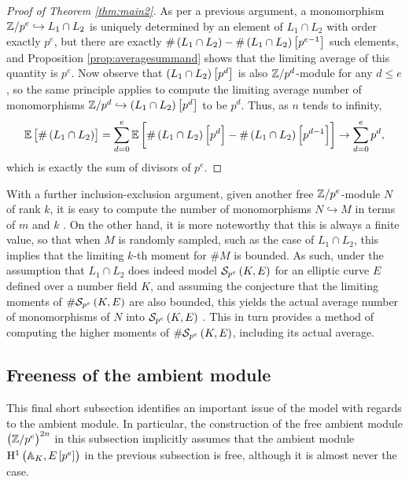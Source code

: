 \begin{proof}[Proof of Theorem \ref{thm:main2}]
As per a previous argument, a monomorphism $ \mathbb{Z} / p^e \hookrightarrow L_1 \cap L_2 $ is uniquely determined by an element of $ L_1 \cap L_2 $ with order exactly $ p^e $, but there are exactly $ \#\br{L_1 \cap L_2} - \#\br{L_1 \cap L_2}\sbr{p^{e - 1}} $ such elements, and Proposition \ref{prop:averagesummand} shows that the limiting average of this quantity is $ p^e $. Now observe that $ \br{L_1 \cap L_2}\sbr{p^d} $ is also $ \mathbb{Z} / p^d $-module for any $ d \le e $, so the same principle applies to compute the limiting average number of monomorphisms $ \ZZ / p^d \hookrightarrow \br{L_1 \cap L_2}\sbr{p^d} $ to be $ p^d $. Thus, as $ n $ tends to infinity,
$$ \EE\sbr{\#\br{L_1 \cap L_2}} = \sum_{d = 0}^e \EE\sbr{\#\br{L_1 \cap L_2}\sbr{p^d} - \#\br{L_1 \cap L_2}\sbr{p^{d - 1}}} \to \sum_{d = 0}^e p^d, $$
which is exactly the sum of divisors of $ p^e $.
\end{proof}

\pagebreak

\begin{remark}
With a further inclusion-exclusion argument, given another free $ \mathbb{Z} / p^e $-module $ N $ of rank $ k $, it is easy to compute the number of monomorphisms $ N \hookrightarrow M $ in terms of $ m $ and $ k $ \cite[Theorem 5.10]{BKLPR15}. On the other hand, it is more noteworthy that this is always a finite value, so that when $ M $ is randomly sampled, such as the case of $ L_1 \cap L_2 $, this implies that the limiting $ k $-th moment for $ \#M $ is bounded. As such, under the assumption that $ L_1 \cap L_2 $ does indeed model $ \Sel[p^e] $ for an elliptic curve $ E $ defined over a number field $ K $, and assuming the conjecture that the limiting moments of $ \#\Sel[p^e] $ are also bounded, this yields the actual average number of monomorphisms of $ N $ into $ \Sel[p^e] $ \cite[Remark 5.13]{BKLPR15}. This in turn provides a method of computing the higher moments of $ \#\Sel[p^e] $, including its actual average.
\end{remark}

\subsection{Freeness of the ambient module}

This final short subsection identifies an important issue of the model with regards to the ambient module. In particular, the construction of the free ambient module $ \br{\ZZ / p^e}^{2n} $ in this subsection implicitly assumes that the ambient module $ \HE[p^e]{\AA_K} $ in the previous subsection is free, although it is almost never the case.

